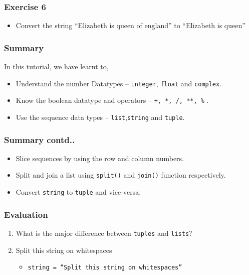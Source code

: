 \documentclass[17pt,compress]{beamer}
\begin{document}
\begin{frame}
\frametitle{Exercise 6}
\label{sec-12}


\begin{itemize}
\item Convert the string ``Elizabeth is queen of england'' to ``Elizabeth is queen''
\end{itemize}

\end{frame}
\begin{frame}
\frametitle{Summary}
\label{sec-13.1}

  In this tutorial, we have learnt to,


\begin{itemize}
\item Understand the number Datatypes -- \texttt{integer}, \texttt{float} and \texttt{complex}.
\item Know the boolean datatype and operators -- \texttt{+, *, /, **, \%} .
\item Use the sequence data types -- \texttt{list},\texttt{string} and \texttt{tuple}.
\end{itemize}
\end{frame}
\begin{frame}
\frametitle{Summary contd..}
\label{sec-13.2}

\begin{itemize}
\item Slice sequences by using the row and column numbers.
\item Split and join a list using \texttt{split()} and \texttt{join()} function respectively.
\item Convert \texttt{string} to \texttt{tuple} and vice-versa.
\end{itemize}
\end{frame}
\begin{frame}
\frametitle{Evaluation}
\label{sec-14}


\begin{enumerate}
\item What is the major difference between \texttt{tuples} and \texttt{lists}?\pause
\vspace{12pt}
\item Split this string on whitespaces
	\begin{itemize}
	\item \texttt{string = ``Split this string on whitespaces''}
	\end{itemize}
\end{enumerate}
\end{frame}
\end{document}
